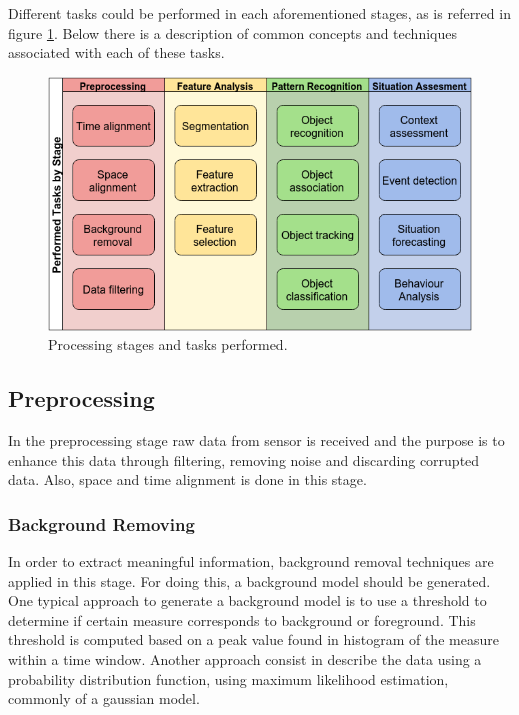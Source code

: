 \documentclass[10pt,twocolumn,letterpaper]{article}
\begin{document}
Different tasks could be performed in each aforementioned stages, as is referred in figure \ref{proc_stages_tasks}. Below there is a description of common concepts and techniques associated with each of these tasks.

\begin{figure}[ht!]
\centering
\includegraphics[scale=0.35]{../fig/3/processing_stages_and_tasks.png}
\caption{Processing stages and tasks performed.}
\label{proc_stages_tasks}
\end{figure}
\subsection{Preprocessing}

 In the preprocessing stage raw data from sensor is received and the purpose is to enhance this data through filtering, removing noise and discarding corrupted data. Also, space and time alignment is done in this stage.

\subsubsection{Background Removing}
 
In order to extract meaningful information, background removal techniques are applied in this stage. For doing this, a background model should be generated. One typical approach to generate a background model is to use a threshold to determine if certain measure corresponds to background or foreground. This threshold is computed based on a peak value found in histogram of the measure within a time window. Another approach consist in describe the data using a probability distribution function, using maximum likelihood estimation, commonly of a gaussian model.
 
\end{document}
